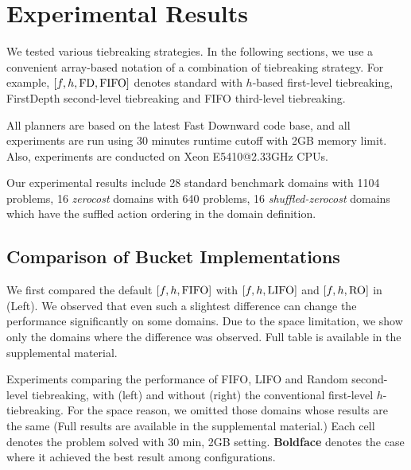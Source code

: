 \section{Experimental Results}


We tested various tiebreaking strategies. In the following sections, we
use a convenient array-based notation of a combination of tiebreaking
strategy.  For example, $[f,h,\mbox{FD},\mbox{FIFO}]$ denotes standard \astar with
$h$-based first-level tiebreaking, FirstDepth second-level tiebreaking and FIFO
third-level tiebreaking.

All planners are based on the latest Fast Downward code base, and all
experiments are run using 30 minutes runtime cutoff with 2GB memory
limit. Also, experiments are conducted on Xeon E5410@2.33GHz CPUs.

Our experimental results include 28 standard benchmark domains with 1104
problems, 16 \emph{zerocost} domains with 640 problems, 16
\emph{shuffled-zerocost} domains which have the suffled action ordering
in the domain definition.

% 
% 
% 
% 

\subsection{Comparison of Bucket Implementations}

We first compared the default $[f,h,\mbox{FIFO}]$ with $[f,h,\mbox{LIFO}]$ and
$[f,h,\mbox{RO}]$ in  (Left).  We observed that even
such a slightest difference can change the performance significantly on
some domains. Due to the space limitation, we show only the domains
where the difference was observed. Full table is available in the
supplemental material.

\begin{table}[htbp]
 \centering {}
 
 
 \caption{Experiments comparing the performance of FIFO, LIFO and Random
 second-level tiebreaking, with (left) and without (right) the
 conventional first-level $h$-tiebreaking.  For the space reason, we
 omitted those domains whose results are the same (Full results are
 available in the supplemental material.) Each cell denotes the problem
 solved with 30 min, 2GB setting. \textbf{Boldface} denotes the case
 where it achieved the best result among configurations.}
 \label{single-coverage}
\end{table}

